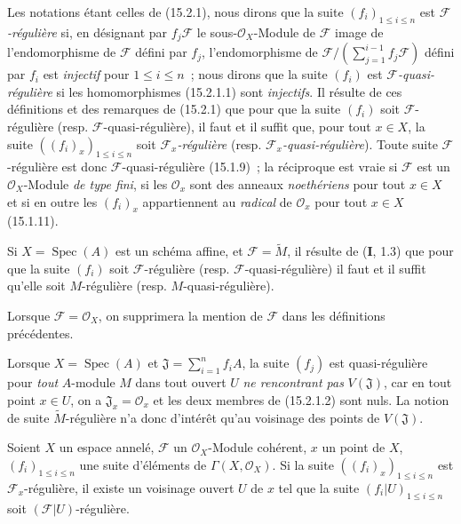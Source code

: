 \begin{env}[15.2.2]
\label{0.15.2.2-fr}
Les notations étant celles de (15.2.1), nous dirons que la suite
$(f_i)_{1\leq i\leq n}$ est \emph{$\mathscr{F}$-régulière} si, en désignant par
$f_j\mathscr{F}$ le sous-$\mathcal{O}_X$-Module de $\mathscr{F}$ image de
l'endomorphisme de $\mathscr{F}$ défini par $f_j$, l'endomorphisme de
$\mathscr{F}/(\sum_{j=1}^{i-1}f_j\mathscr{F})$ défini par $f_i$ est \emph{injectif}
pour $1\leq i\leq n$~; nous dirons que la suite $(f_i)$ est
\emph{$\mathscr{F}$-quasi-régulière} si les homomorphismes (15.2.1.1) sont \emph{injectifs}.
Il résulte de ces définitions et des remarques de (15.2.1) que pour que la
suite $(f_i)$ soit $\mathscr{F}$-régulière (resp.
$\mathscr{F}$-quasi-régulière), il faut et il suffit que, pour tout $x\in X$,
la suite $((f_i)_x)_{1\leq i\leq n}$ soit \emph{$\mathscr{F}_x$-régulière} (resp.
\emph{$\mathscr{F}_x$-quasi-régulière}). Toute suite $\mathscr{F}$-régulière est donc
$\mathscr{F}$-quasi-régulière (15.1.9)~; la réciproque est vraie si
$\mathscr{F}$ est un $\mathcal{O}_X$-Module \emph{de type fini}, si les
$\mathcal{O}_x$ sont des anneaux \emph{noethériens} pour tout $x\in X$ et si en outre
les $(f_i)_x$ appartiennent au \emph{radical} de $\mathcal{O}_x$ pour tout $x\in X$
(15.1.11).

Si $X=\operatorname{Spec}(A)$ est un schéma affine, et
$\mathscr{F}=\widetilde{M}$, il
résulte de (\textbf{I}, 1.3) que pour que la suite $(f_i)$ soit
$\mathscr{F}$-régulière (resp. $\mathscr{F}$-quasi-régulière) il faut et il
suffit qu'elle soit $M$-régulière (resp. $M$-quasi-régulière).

Lorsque $\mathscr{F}=\mathcal{O}_X$, on supprimera la mention de
$\mathscr{F}$ dans les définitions précédentes.
\end{env}

\begin{remark}[15.2.3]
\label{0.15.2.3-fr}
Lorsque $X=\operatorname{Spec}(A)$ et
$\mathfrak{J}=\sum_{i=1}^n f_iA$, la suite $(f_j)$ est
quasi-régulière pour \emph{tout} $A$-module $M$ dans tout ouvert $U$ \emph{ne rencontrant
pas} $V(\mathfrak{J})$, car en tout point $x\in U$, on a
$\mathfrak{J}_x=\mathcal{O}_x$ et les deux membres de (15.2.1.2) sont nuls. La
notion de suite $\widetilde{M}$-régulière n'a donc d'intérêt qu'au voisinage
des points de $V(\mathfrak{J})$.
\end{remark}

\begin{proposition}[15.2.4]
\label{0.15.2.4-fr}
Soient $X$ un espace annelé, $\mathscr{F}$ un $\mathcal{O}_X$-Module cohérent,
$x$ un point de $X$, $(f_i)_{1\leq i\leq n}$ une suite d'éléments de
$\Gamma(X,\mathcal{O}_X)$. Si la suite $((f_i)_x)_{1\leq i\leq n}$ est
$\mathscr{F}_x$-régulière, il existe un voisinage ouvert $U$ de $x$ tel que la
suite $(f_i|U)_{1\leq i\leq n}$ soit $(\mathscr{F}|U)$-régulière.
\end{proposition}

